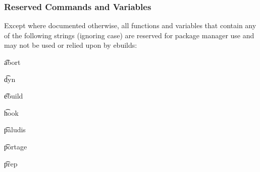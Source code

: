 \subsubsection{Reserved Commands and Variables}

Except where documented otherwise, all functions and variables that contain any of the following
strings (ignoring case) are reserved for package manager use and may not be used or relied upon by
ebuilds:

\begin{compactitem}
\item \t{abort}
\item \t{dyn}
\item \t{ebuild}
\item \t{hook}
\item \t{paludis}
\item \t{portage}
\item \t{prep}
\end{compactitem}


